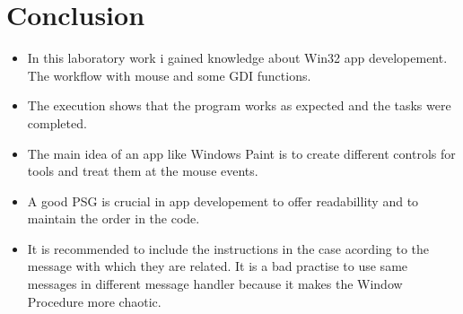 \section*{Conclusion}


\begin{itemize}
	\item In this laboratory work i gained knowledge about Win32 app developement. The workflow with mouse and some GDI functions.
	\item The execution shows that the program works as expected and the tasks were completed.
	\item The main idea of an app like Windows Paint is to create different controls for tools and treat them at the mouse events.
	\item A good PSG is crucial in app developement to offer readabillity and to maintain the order in the code. 
	\item It is recommended to include the instructions in the case acording to the message with which they are related. It is a bad practise to use same messages in different message handler because it makes the Window Procedure more chaotic.  
\end{itemize}

\clearpage